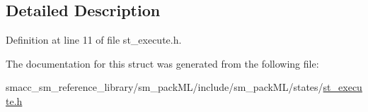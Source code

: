 \subsection{Detailed Description}


Definition at line 11 of file st\+\_\+execute.\+h.



The documentation for this struct was generated from the following file\+:\begin{DoxyCompactItemize}
\item 
smacc\+\_\+sm\+\_\+reference\+\_\+library/sm\+\_\+pack\+M\+L/include/sm\+\_\+pack\+M\+L/states/\hyperlink{st__execute_8h}{st\+\_\+execute.\+h}\end{DoxyCompactItemize}
